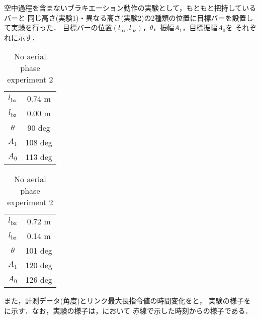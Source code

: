         空中過程を含まないブラキエーション動作の実験として，もともと把持しているバーと
        同じ高さ(実験1)・異なる高さ(実験2)の2種類の位置に目標バーを設置して実験を行った．
        目標バーの位置$(l_{\mathrm{bx}},l_{\mathrm{bz}})$，$\theta$，振幅$A_1$，目標振幅$A_0$を
        それぞれに示す．
        \begin{table}[t]
                \begin{minipage}[c]{0.5\hsize}
                  \centering
                  \caption{No aerial phase experiment 1}
                  \vspace{2mm}
                  \begin{tabular}{c|c}
                    \hline
                    $l_{\mathrm{bx}}$ & 0.74 m \\
                    $l_{\mathrm{bz}}$ & 0.00 m \\
                    $\theta$ & 90 deg \\ 
                    $A_1$ & 108 deg \\
                    $A_0$ & 113 deg \\
                    \hline
                  \end{tabular}
                \end{minipage}
                \begin{minipage}[c]{0.5\hsize}
                  \centering
                  \caption{No aerial phase experiment 2}
                  \vspace{2mm}
                  \begin{tabular}{c|c}
                    \hline
                    $l_{\mathrm{bx}}$ & 0.72 m \\
                    $l_{\mathrm{bz}}$ & 0.14 m \\
                    $\theta$ & 101 deg \\ 
                    $A_1$ & 120 deg \\
                    $A_0$ & 126 deg \\
                    \hline
                  \end{tabular}
                \end{minipage}
              \end{table}
        また，計測データ(角度)とリンク最大長指令値の時間変化をと，
        実験の様子をに示す．なお，実験の様子は，において
        赤線で示した時刻からの様子である．
        \newpage

